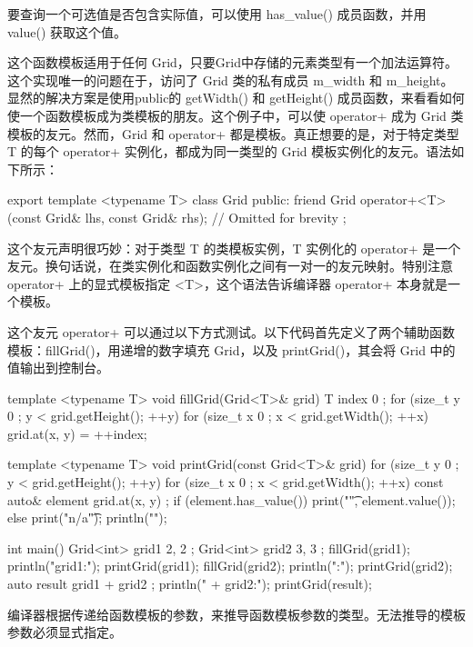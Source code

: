 要查询一个可选值是否包含实际值，可以使用 has\_value() 成员函数，并用 value() 获取这个值。

这个函数模板适用于任何 Grid，只要Grid中存储的元素类型有一个加法运算符。这个实现唯一的问题在于，访问了 Grid 类的私有成员 m\_width 和 m\_height。显然的解决方案是使用public的 getWidth() 和 getHeight() 成员函数，来看看如何使一个函数模板成为类模板的朋友。这个例子中，可以使 operator+ 成为 Grid 类模板的友元。然而，Grid 和 operator+ 都是模板。真正想要的是，对于特定类型 T 的每个 operator+ 实例化，都成为同一类型的 Grid 模板实例化的友元。语法如下所示：

\begin{cpp}
export template <typename T>
class Grid
{
    public:
        friend Grid operator+<T>(const Grid& lhs, const Grid& rhs);
        // Omitted for brevity
};
\end{cpp}

这个友元声明很巧妙：对于类型 T 的类模板实例，T 实例化的 operator+ 是一个友元。换句话说，在类实例化和函数实例化之间有一对一的友元映射。特别注意 operator+ 上的显式模板指定 <T>，这个语法告诉编译器 operator+ 本身就是一个模板。

这个友元 operator+ 可以通过以下方式测试。以下代码首先定义了两个辅助函数模板：fillGrid()，用递增的数字填充 Grid，以及 printGrid()，其会将 Grid 中的值输出到控制台。


\begin{cpp}
template <typename T> void fillGrid(Grid<T>& grid)
{
    T index { 0 };
    for (size_t y { 0 }; y < grid.getHeight(); ++y) {
        for (size_t x { 0 }; x < grid.getWidth(); ++x) {
            grid.at(x, y) = ++index;
        }
    }
}

template <typename T> void printGrid(const Grid<T>& grid)
{
    for (size_t y { 0 }; y < grid.getHeight(); ++y) {
        for (size_t x { 0 }; x < grid.getWidth(); ++x) {
            const auto& element { grid.at(x, y) };
            if (element.has_value()) { print("{}\t", element.value()); }
            else { print("n/a\t"); }
        }
        println("");
    }
}

int main()
{
    Grid<int> grid1 { 2, 2 };
    Grid<int> grid2 { 3, 3 };
    fillGrid(grid1); println("grid1:"); printGrid(grid1);
    fillGrid(grid2); println(":"); printGrid(grid2);
    auto result { grid1 + grid2 };
    println(" + grid2:"); printGrid(result);
}
\end{cpp}


编译器根据传递给函数模板的参数，来推导函数模板参数的类型。无法推导的模板参数必须显式指定。

